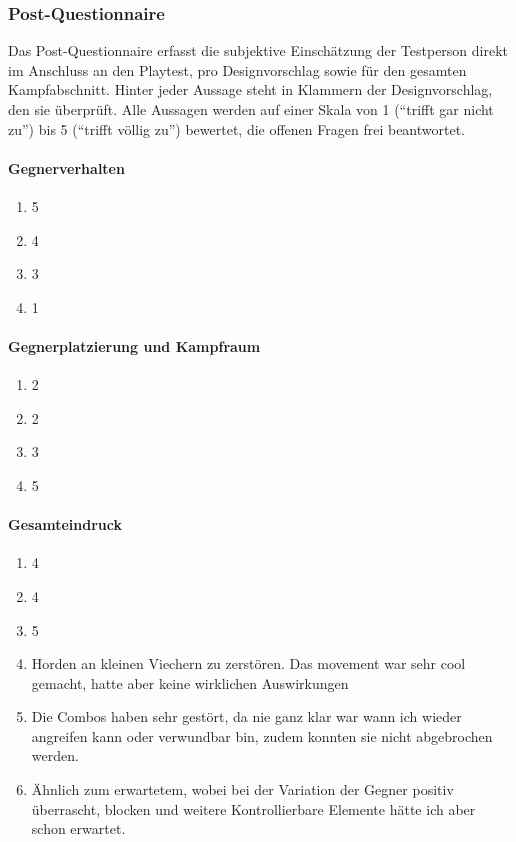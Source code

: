 \documentclass[../Main.tex]{subfiles}
\begin{document}
\subsubsection{Post-Questionnaire}

Das Post-Questionnaire erfasst die subjektive Einschätzung der Testperson direkt im Anschluss an den Playtest, pro Designvorschlag sowie für den gesamten Kampfabschnitt. Hinter jeder Aussage steht in Klammern der Designvorschlag, den sie überprüft. Alle Aussagen werden auf einer Skala von 1 (\enquote{trifft gar nicht zu}) bis 5 (\enquote{trifft völlig zu}) bewertet, die offenen Fragen frei beantwortet.

\paragraph{Gegnerverhalten}
\begin{enumerate}[label=\textbf{Q\arabic*}, leftmargin=1.5cm, itemsep=0.5em]
\item 5
\item 4
\item 3
\item 1
\end{enumerate}

\paragraph{Gegnerplatzierung und Kampfraum}
\begin{enumerate}[label=\textbf{Q\arabic*}, leftmargin=1.5cm, itemsep=0.5em, resume]
\item 2
\item 2
\item 3
\item 5
\end{enumerate}

\paragraph{Gesamteindruck}
\begin{enumerate}[label=\textbf{Q\arabic*}, leftmargin=1.5cm, itemsep=0.5em, resume]
\item 4
\item 4
\item 5
\item Horden an kleinen Viechern zu zerstören. Das movement war sehr cool gemacht, hatte aber keine wirklichen Auswirkungen
\item Die Combos haben sehr gestört, da nie ganz klar war wann ich wieder angreifen kann oder verwundbar bin, zudem konnten sie nicht abgebrochen werden.
\item Ähnlich zum erwartetem, wobei bei der Variation der Gegner positiv überrascht, blocken und weitere Kontrollierbare Elemente hätte ich aber schon erwartet.
\end{enumerate}
\end{document}
